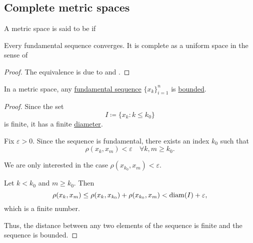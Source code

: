 \subsection{Complete metric spaces}\label{subsec:metric_convergence}

\begin{definition}\label{def:complete_metric_space}
  A metric space is said to be  if
  \begin{thmenum}
     Every fundamental sequence converges.
     It is complete as a uniform space in the sense of 
  \end{thmenum}
\end{definition}
\begin{proof}
  The equivalence is due to  and .
\end{proof}

\begin{proposition}\label{thm:fundamental_sequence_is_bounded}
  In a metric space, any \hyperref[def:fundamental_net]{fundamental sequence} \( \{ x_k \}_{i=1}^n \) is \hyperref[def:metric_space/bounded_sequence]{bounded}.
\end{proposition}
\begin{proof}
  Since the set
  \begin{equation*}
    I \coloneqq \{ x_k \colon k \leq k_0 \}
  \end{equation*}
  is finite, it has a finite \hyperref[def:metric_space/diameter]{diameter}.

  Fix \( \varepsilon > 0 \). Since the sequence is fundamental, there exists an index \( k_0 \) such that
  \begin{equation*}
    \rho(x_k, x_m) < \varepsilon \quad\forall k, m \geq k_0.
  \end{equation*}

  We are only interested in the case \( \rho(x_{k_0}, x_m) < \varepsilon \).

  Let \( k < k_0 \) and \( m \geq k_0 \). Then
  \begin{equation*}
    \rho(x_k, x_m) \leq \rho(x_k, x_{k_0}) + \rho(x_{k_0}, x_m) < \operatorname{diam}(I) + \varepsilon,
  \end{equation*}
  which is a finite number.

  Thus, the distance between any two elements of the sequence is finite and the sequence is bounded.
\end{proof}

